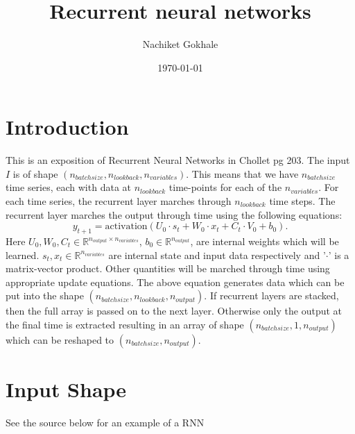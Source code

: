\documentclass{article}
\newcommand{\beq}{\begin{equation}}
\newcommand{\eeq}{\end{equation}}
\begin{document}
\title{Recurrent neural networks}
\author{Nachiket Gokhale}
\date{\today}
\maketitle
\section{Introduction}
This is an exposition of Recurrent Neural Networks in Chollet pg 203. The input $I$ is of shape $(n_{batchsize},n_{lookback},n_{variables})$. This means that we have $n_{batchsize}$ time series, each with data at $n_{lookback}$ time-points for each of the $n_{variables}$. For each time series, the recurrent layer marches through $n_{lookback}$ time steps. The recurrent layer marches the output through time using the following equations:
\beq
y_{t+1} = \text{activation}(U_0\cdot{s_t} + W_0\cdot{x_t} + C_t\cdot{V_0} + b_{0}).
\eeq
Here $U_0,W_0,C_t \in \mathbb{R}^{n_{output}\times{n_{variables}}}$, $b_0 \in \mathbb{R}^{n_{output}}$, are internal weights which will be learned. $s_{t},x_{t} \in \mathbb{R}^{n_{variables}}$ are internal state and input data respectively and '$\cdot$' is a matrix-vector product. Other quantities will be marched through time using appropriate update equations. The above equation generates data which can be put into the shape $(n_{batchsize},n_{lookback},n_{output})$. If recurrent layers are stacked, then the full array is passed on to the next layer. Otherwise only the output at the final time is extracted resulting in an array of shape $(n_{batchsize},1,n_{output})$ which can be reshaped to $(n_{batchsize},n_{output})$.

\section{Input Shape}
See the source below for an example of a RNN
\begin{center}
  
\end{center}  
\end{document}
